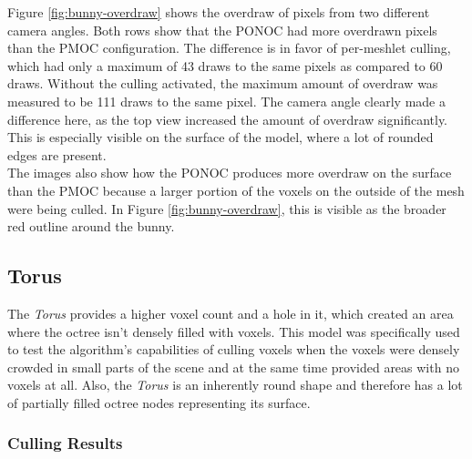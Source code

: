 \noindent
Figure \ref{fig:bunny-overdraw} shows the overdraw of pixels from two different camera angles.
Both rows show that the \ac{PONOC} had more overdrawn pixels than the 
\ac{PMOC} configuration. The difference is in favor of per-meshlet 
culling, which had only a maximum of 43 draws to the same pixels as compared to 60 draws. Without 
the culling activated, the maximum amount of overdraw was measured to be 111 draws to the same pixel.
The camera angle clearly made a difference here, as the top view increased the amount of 
overdraw significantly. This is especially visible on the surface of the model, where a lot 
of rounded edges are present. \\

\noindent
The images also show how the \ac{PONOC} produces more overdraw on the surface than the 
\ac{PMOC} because a larger portion of the voxels on the outside of the mesh were being 
culled. In Figure \ref{fig:bunny-overdraw}, this is visible as the broader red outline around the 
bunny.

\clearpage



\subsection*{Torus}

The \emph{Torus} provides a higher voxel count and a hole in it, which created an area where the 
octree isn't densely filled with voxels. This model was specifically used to test the algorithm's 
capabilities of culling voxels when the voxels were densely crowded in small parts of the scene and 
at the same time provided areas with no voxels at all. Also, the \emph{Torus} is an inherently round 
shape and therefore has a lot of partially filled octree nodes representing its surface. 

\subsubsection*{Culling Results} \label{subsubsec-culling-results-torus}



